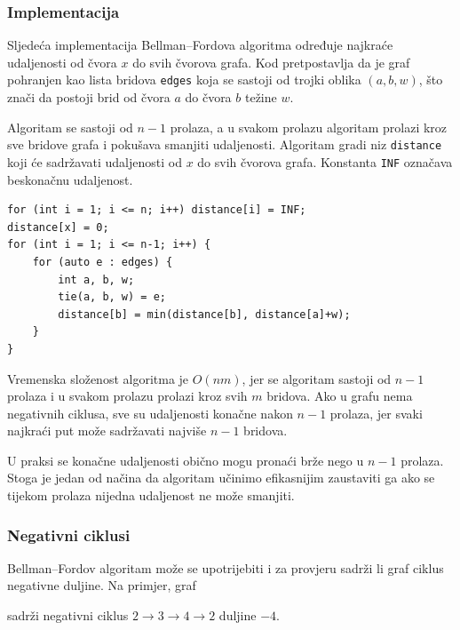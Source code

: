 \subsubsection{Implementacija}

Sljedeća implementacija
Bellman–Fordova algoritma određuje najkraće udaljenosti
od čvora $x$ do svih čvorova grafa.
Kod pretpostavlja da je graf pohranjen
kao lista bridova \texttt{edges}
koja se sastoji od trojki oblika $(a,b,w)$,
što znači da postoji brid od čvora $a$ do čvora $b$
težine $w$.

Algoritam se sastoji od $n-1$ prolaza,
a u svakom prolazu algoritam prolazi kroz
sve bridove grafa i pokušava
smanjiti udaljenosti.
Algoritam gradi niz \texttt{distance}
koji će sadržavati udaljenosti od $x$
do svih čvorova grafa.
Konstanta \texttt{INF} označava beskonačnu udaljenost.

\begin{lstlisting}
for (int i = 1; i <= n; i++) distance[i] = INF;
distance[x] = 0;
for (int i = 1; i <= n-1; i++) {
    for (auto e : edges) {
        int a, b, w;
        tie(a, b, w) = e;
        distance[b] = min(distance[b], distance[a]+w);
    }
}
\end{lstlisting}

Vremenska složenost algoritma je $O(nm)$,
jer se algoritam sastoji od $n-1$ prolaza i
u svakom prolazu prolazi kroz svih $m$ bridova.
Ako u grafu nema negativnih ciklusa,
sve su udaljenosti konačne nakon $n-1$ prolaza,
jer svaki najkraći put može sadržavati najviše $n-1$ bridova.

U praksi se konačne udaljenosti obično
mogu pronaći brže nego u $n-1$ prolaza.
Stoga je jedan od načina da algoritam učinimo efikasnijim
zaustaviti ga ako se tijekom prolaza
nijedna udaljenost ne može smanjiti.

\subsubsection{Negativni ciklusi}


Bellman–Fordov algoritam može se upotrijebiti i za
provjeru sadrži li graf ciklus negativne duljine.
Na primjer, graf

\begin{center}
\end{center}
\noindent
sadrži negativni ciklus
$2 \rightarrow 3 \rightarrow 4 \rightarrow 2$
duljine $-4$.

